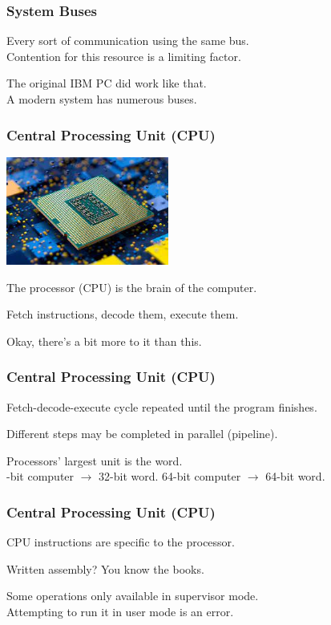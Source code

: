 \begin{frame}
\frametitle{System Buses}

Every sort of communication using the same bus.\\
\quad Contention for this resource is a limiting factor. 

The original IBM PC did work like that.\\
\quad A modern system has numerous buses.

\end{frame}

\begin{frame}
\frametitle{Central Processing Unit (CPU)}

\begin{center}
	\includegraphics[width=0.4\textwidth]{images/cpu.jpg}
\end{center}


The processor (CPU) is the brain of the computer.

Fetch instructions, decode them, execute them.

Okay, there's a bit more to it than this.

\end{frame}

\begin{frame}
\frametitle{Central Processing Unit (CPU)}

Fetch-decode-execute cycle repeated until the program finishes.

Different steps may be completed in parallel (\alert{pipeline}).

Processors' largest unit is the \alert{word}.\\
-bit computer $\rightarrow$ 32-bit word. 64-bit computer $\rightarrow$ 64-bit word.

\end{frame}

\begin{frame}
\frametitle{Central Processing Unit (CPU)}


CPU instructions are specific to the processor.

Written assembly? You know the books.

Some operations only available in supervisor mode.\\
\quad Attempting to run it in user mode is an error.


\end{frame}

